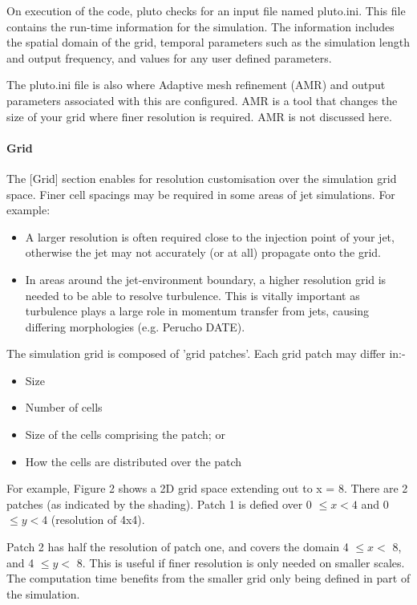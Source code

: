 \documentclass[12pt,a4paper]{report}
\begin{document}
On execution of the code, pluto checks for an input file named pluto.ini. This file contains the run-time information for the simulation. The information includes the spatial domain of the grid, temporal parameters such as the simulation length and output frequency, and values for any user defined parameters.

The pluto.ini file is also where Adaptive mesh refinement (AMR) and output parameters associated with this are configured. AMR is a tool that changes the size of your grid where finer resolution is required. AMR is not discussed here.

\paragraph{Grid}\mbox{}
\newline
 The [Grid] section enables for resolution customisation over the simulation grid space. Finer cell spacings may be required in some areas of jet simulations. For example:
 
 \begin{itemize}
  \item A larger resolution is often required close to the injection point of your jet, otherwise the jet may not accurately (or at all) propagate onto the grid.
  
  
 \item In areas around the jet-environment boundary, a higher resolution grid is needed to be able to resolve turbulence. This is vitally important as turbulence plays a large role in momentum transfer from jets, causing differing morphologies (e.g. Perucho DATE). 
 \end{itemize}
The simulation grid is composed of 'grid patches'. Each grid patch may differ in:- 
\begin{itemize}
\item Size
\item Number of cells
\item Size of the cells comprising the patch; or
\item How the cells are distributed over the patch
\end{itemize}For example, Figure 2  shows a 2D grid space extending out to x = 8.  There are 2 patches (as indicated by the shading). Patch 1 is defied over 0 $\leq x < 4$ and 0 $\leq y < 4$  (resolution of 4x4).

Patch 2 has half the resolution of patch one, and covers the domain 4 $\leq x <$ 8, and 4 $\leq y <$ 8. 
This is useful if finer resolution is only needed on smaller scales. The computation time benefits from the smaller grid only being defined in part of the simulation.
\end{document}

